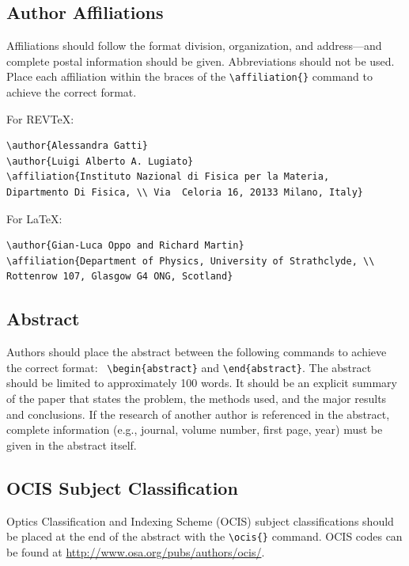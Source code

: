 \documentclass[letterpaper,12pt]{article}   %
\begin{document}
\subsection{Author Affiliations}
Affiliations should follow the format division, organization, and
address---and complete postal information should be given.
Abbreviations should not be used. Place each affiliation within
the braces of the \verb+\affiliation{}+ command to achieve the
correct format.

\bigskip

For REV\TeX:
\begin{verbatim}
\author{Alessandra Gatti}
\author{Luigi Alberto A. Lugiato}
\affiliation{Instituto Nazional di Fisica per la Materia,
Dipartmento Di Fisica, \\ Via  Celoria 16, 20133 Milano, Italy}
\end{verbatim}

\bigskip

For \LaTeX:
\begin{verbatim}
\author{Gian-Luca Oppo and Richard Martin}
\affiliation{Department of Physics, University of Strathclyde, \\
Rottenrow 107, Glasgow G4 ONG, Scotland}
\end{verbatim}

\subsection{Abstract} Authors should place the abstract between
the following commands to achieve the correct format: \
\verb+\begin{abstract}+ and \verb+\end{abstract}+. The abstract
should be limited to approximately 100 words. It should be an
explicit summary of the paper that states the problem, the methods
used, and the major results and conclusions. If the research of
another author is referenced in the abstract, complete information
(e.g., journal, volume number, first page, year) must be
given in the abstract itself.

\subsection{OCIS Subject Classification} Optics Classification and
Indexing Scheme (OCIS) subject classifications should be placed at
the end of the abstract with the \verb+\ocis{}+ command. OCIS
codes can be found at \href{http://www.osa.org/pubs/authors/ocis/}{http://www.osa.org/pubs/authors/ocis/}.
\end{document}
